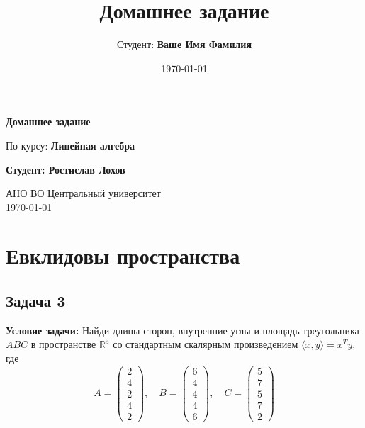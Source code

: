 \documentclass[a4paper,12pt]{article}
\title{Домашнее задание}
\author{Студент: \textbf{Ваше Имя Фамилия}}
\date{\today}
\begin{document}
\begin{titlepage}
    \centering
    \vspace*{1cm}

    \Huge
    \textbf{Домашнее задание}

    \vspace{0.5cm}
    \LARGE
    По курсу: \textbf{Линейная алгебра}

    \vspace{1.5cm}

    \textbf{Студент: Ростислав Лохов}

    \vfill

    \Large
    АНО ВО Центральный университет\\
    \vspace{0.3cm}
    \today

\end{titlepage}

\tableofcontents
\newpage

\section{Евклидовы пространства}

\subsection{Задача 3}
\textbf{Условие задачи:} Найди длины сторон, внутренние углы и площадь треугольника $ABC$ в пространстве $\mathbb{R}^5$ со стандартным скалярным произведением $\langle x, y \rangle = x^Ty$, где 
\[
A = 
\begin{pmatrix}
2 \\ 4 \\ 2 \\ 4 \\ 2
\end{pmatrix}, \quad 
B = 
\begin{pmatrix}
6 \\ 4 \\ 4 \\ 4 \\ 6
\end{pmatrix}, \quad 
C = 
\begin{pmatrix}
5 \\ 7 \\ 5 \\ 7 \\ 2
\end{pmatrix}
\]
\end{document}

